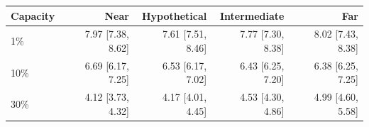 \begin{tabular}{lrrrr}
\toprule
Capacity & Near & Hypothetical & Intermediate & Far \\
\midrule
1\% & 7.97 [7.38, 8.62] & 7.61 [7.51, 8.46] & 7.77 [7.30, 8.38] & 8.02 [7.43, 8.38] \\
10\% & 6.69 [6.17, 7.25] & 6.53 [6.17, 7.02] & 6.43 [6.25, 7.20] & 6.38 [6.25, 7.25] \\
30\% & 4.12 [3.73, 4.32] & 4.17 [4.01, 4.45] & 4.53 [4.30, 4.86] & 4.99 [4.60, 5.58] \\
\bottomrule
\end{tabular}
